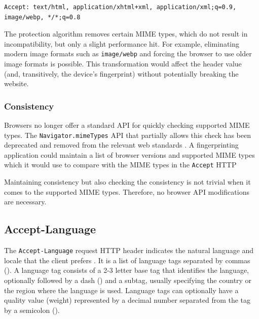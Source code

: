 \bigbreak

\begin{lstlisting}[caption={An example of Accept header contents \cite{MDN}.}]
Accept: text/html, application/xhtml+xml, application/xml;q=0.9, image/webp, */*;q=0.8
\end{lstlisting}

\medbreak

The protection algorithm removes certain MIME types, which do not result in incompatibility, but only a slight performance hit. For example, eliminating modern image formats such as \texttt{image/webp} and forcing the browser to use older image formats is possible. This transformation would affect the header value (and, transitively, the device's fingerprint) without potentially breaking the website.

\subsubsection{Consistency}

Browsers no longer offer a standard API for quickly checking supported MIME types. The \texttt{Navigator.mimeTypes} API that partially allows this check has been deprecated and removed from the relevant web standards \cite{MDNNavigatorInterface}. A fingerprinting application could maintain a list of browser versions and supported MIME types which it would use to compare with the MIME types in the \texttt{Accept} HTTP 

Maintaining consistency but also checking the consistency is not trivial when it comes to the supported MIME types. Therefore, no browser API modifications are necessary.

\subsection{Accept-Language}
\label{SubSection:AcceptLanguage}

The \texttt{Accept-Language} request HTTP header indicates the natural language and locale that the client prefers \cite{MDN}. It is a list of language tags separated by commas (\uv{,}). A language tag consists of a 2-3 letter base tag that identifies the language, optionally followed by a dash (\uv{-}) and a subtag, usually specifying the country or the region where the language is used. Language tags can optionally have a quality value (weight) represented by a decimal number separated from the tag by a semicolon (\uv{;}).

\bigbreak

